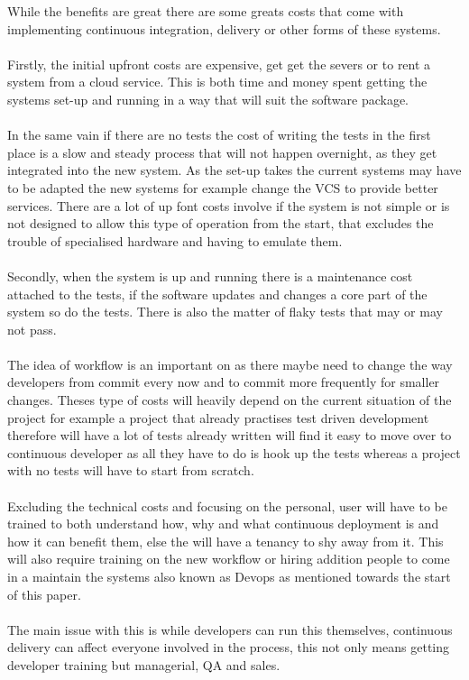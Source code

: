 While the benefits are great there are some greats costs that come with implementing continuous integration, delivery or other forms of these systems.
\\\\
Firstly, the initial upfront costs are expensive, get get the severs or to rent a system from a cloud service. This is both time and money spent getting the systems set-up and running in a way that will suit the software package. 
\\\\
In the same vain if there are no tests the cost of writing the tests in the first place is a slow and steady process that will not happen overnight, as they get integrated into the new system. As the set-up takes the current systems may have to be adapted the new systems for example change the VCS to provide better services. There are a lot of up font costs involve if the system is not simple or is not designed to allow this type of operation from the start, that excludes the trouble of specialised hardware and having to emulate them. 
\\\\
Secondly, when the system is up and running there is a maintenance cost attached to the tests, if the software updates and changes a core part of the system so do the tests. There is also the matter of flaky tests that may or may not pass.
\\\\
The idea of workflow is an important on as there maybe need to change the way developers from commit every now and to commit more frequently for smaller changes. Theses type of costs will heavily depend on the current situation of the project for example a project that already practises test driven development therefore will have a lot of tests already written will find it easy to move over to continuous developer as all they have to do is hook up the tests whereas a project with no tests will have to start from scratch. 
\\\\
Excluding the technical costs and focusing on the personal, user will have to be trained to both understand how, why and what continuous deployment is and how it can benefit them, else the will have a tenancy to shy away from it. This will also require training on the new workflow or hiring addition people to come in a maintain the systems also known as Devops as mentioned towards the start of this paper.
\\\\
The main issue with this is while developers can run this themselves, continuous delivery can affect everyone involved in the process, this not only means getting developer training but managerial, QA and sales. 

